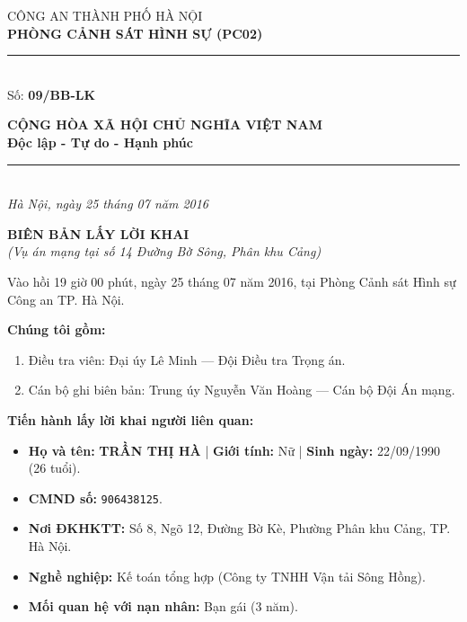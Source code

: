 \documentclass[12pt,a4paper]{article}
\begin{document}
\noindent
\begin{minipage}[t]{0.46\textwidth}
    \begin{center}
        \fontsize{11pt}{13pt}\selectfont
        CÔNG AN THÀNH PHỐ HÀ NỘI\\
        \textbf{PHÒNG CẢNH SÁT HÌNH SỰ (PC02)}\\[-0.2em]
        \rule{3.2cm}{0.6pt}\\[0.25cm]
        \fontsize{11pt}{13pt}\selectfont Số: \textbf{09/BB-LK}
    \end{center}
\end{minipage}
\hfill
\begin{minipage}[t]{0.52\textwidth}
    \begin{center}
        \fontsize{11pt}{13pt}\selectfont
        \textbf{CỘNG HÒA XÃ HỘI CHỦ NGHĨA VIỆT NAM}\\
        \textbf{Độc lập - Tự do - Hạnh phúc}\\[-0.2em]
        \rule{3.6cm}{0.6pt}\\[0.25cm]
        \textit{Hà Nội, ngày 25 tháng 07 năm 2016}
    \end{center}
\end{minipage}

\vspace{0.5cm}

\begin{center}
    \textbf{\Large BIÊN BẢN LẤY LỜI KHAI}\\[0.15cm]
    \textit{(Vụ án mạng tại số 14 Đường Bờ Sông, Phân khu Cảng)}
\end{center}

\vspace{0.3cm}


Vào hồi 19 giờ 00 phút, ngày 25 tháng 07 năm 2016, tại Phòng Cảnh sát Hình sự Công an TP. Hà Nội.

\textbf{Chúng tôi gồm:}

\begin{enumerate}[label=\arabic*., leftmargin=*, itemsep=2pt, topsep=2pt, parsep=0pt]
  \item Điều tra viên: Đại úy Lê Minh — Đội Điều tra Trọng án.
  \item Cán bộ ghi biên bản: Trung úy Nguyễn Văn Hoàng — Cán bộ Đội Án mạng.

\end{enumerate}
\textbf{Tiến hành lấy lời khai người liên quan:}

\begin{itemize}[leftmargin=*, itemsep=2pt, topsep=2pt, parsep=0pt]
  \item \textbf{Họ và tên:} \textbf{TRẦN THỊ HÀ} | \textbf{Giới tính:} Nữ | \textbf{Sinh ngày:} 22/09/1990 (26 tuổi).
  \item \textbf{CMND số:} \texttt{906438125}.
  \item \textbf{Nơi ĐKHKTT:} Số 8, Ngõ 12, Đường Bờ Kè, Phường Phân khu Cảng, TP. Hà Nội.
  \item \textbf{Nghề nghiệp:} Kế toán tổng hợp (Công ty TNHH Vận tải Sông Hồng).
  \item \textbf{Mối quan hệ với nạn nhân:} Bạn gái (3 năm).


\end{itemize}
\end{document}
